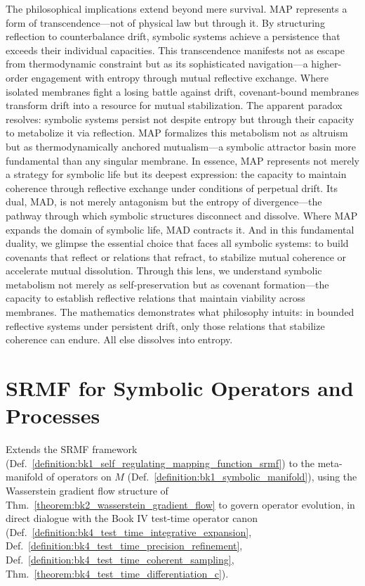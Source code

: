 \begin{scholium}
The philosophical implications extend beyond mere survival. MAP represents a form of transcendence—not of physical law but through it. By structuring reflection to counterbalance drift, symbolic systems achieve a persistence that exceeds their individual capacities. This transcendence manifests not as escape from thermodynamic constraint but as its sophisticated navigation—a higher-order engagement with entropy through mutual reflective exchange.
Where isolated membranes fight a losing battle against drift, covenant-bound membranes transform drift into a resource for mutual stabilization. The apparent paradox resolves: symbolic systems persist not despite entropy but through their capacity to metabolize it via reflection. MAP formalizes this metabolism not as altruism but as thermodynamically anchored mutualism—a symbolic attractor basin more fundamental than any singular membrane.
In essence, MAP represents not merely a strategy for symbolic life but its deepest expression: the capacity to maintain coherence through reflective exchange under conditions of perpetual drift. Its dual, MAD, is not merely antagonism but the entropy of divergence—the pathway through which symbolic structures disconnect and dissolve. Where MAP expands the domain of symbolic life, MAD contracts it. And in this fundamental duality, we glimpse the essential choice that faces all symbolic systems: to build covenants that reflect or relations that refract, to stabilize mutual coherence or accelerate mutual dissolution.
Through this lens, we understand symbolic metabolism not merely as self-preservation but as covenant formation—the capacity to establish reflective relations that maintain viability across membranes. The mathematics demonstrates what philosophy intuits: in bounded reflective systems under persistent drift, only those relations that stabilize coherence can endure. All else dissolves into entropy.
\end{scholium}
\section{SRMF for Symbolic Operators and Processes}
\label{sec:bk5_srmf_for_symbolic_operators_and_processes}
Extends the SRMF framework (Def.~\ref{definition:bk1_self_regulating_mapping_function_srmf}) to the meta-manifold of operators on $M$ (Def.~\ref{definition:bk1_symbolic_manifold}), using the Wasserstein gradient flow structure of Thm.~\ref{theorem:bk2_wasserstein_gradient_flow} to govern operator evolution, in direct dialogue with the Book IV test-time operator canon (Def.~\ref{definition:bk4_test_time_integrative_expansion}, Def.~\ref{definition:bk4_test_time_precision_refinement}, Def.~\ref{definition:bk4_test_time_coherent_sampling}, Thm.~\ref{theorem:bk4_test_time_differentiation_c}).
